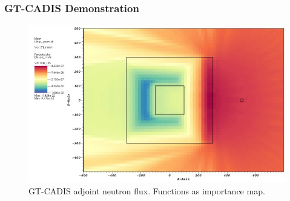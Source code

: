 \documentclass{beamer}
\begin{document}
\begin{frame}
\frametitle{GT-CADIS Demonstration}

%
        \begin{figure}
	\centering
	\includegraphics[scale=0.290]{gtcadis_adjn.jpg}
		\caption{GT-CADIS adjoint neutron flux. Functions as importance
		map.}
	\end{figure}

\end{frame}
 
\end{document}
